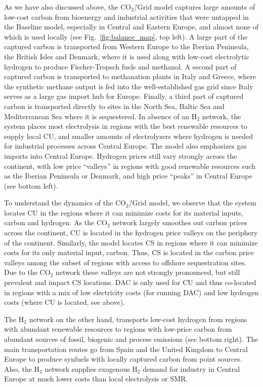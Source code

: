 \documentclass[twocolumn]{article}
\newcommand{\COtwo}{CO$_2$}
\newcommand{\Htwo}{H$_2$}
\newcommand{\modBase}{Baseline model}
\newcommand{\modCO}{CO$_2$\=/Grid model}
\begin{document}
As we have also discussed above, the \modCO{} captures large amounts of low-cost carbon from bioenergy and industrial activities that were untapped in the \modBase{}, especially in Central and Eastern Europe, and almost none of which is used locally (see Fig.~\ref{fig:balance_map}, top left). A large part of the captured carbon is transported from Western Europe to the Iberian Peninsula, the British Isles and Denmark, where it is used along with low-cost electrolytic hydrogen to produce Fischer-Tropsch fuels and methanol. A second part of captured carbon is transported to methanation plants in Italy and Greece, where the synthetic methane output is fed into the well-established gas grid since Italy serves as a large gas import hub for Europe. Finally, a third part of captured carbon is transported directly to sites in the North Sea, Baltic Sea and Mediterranean Sea where it is sequestered. In absence of an \Htwo{} network, the system places most electrolysis in regions with the best renewable resources to supply local CU, and smaller amounts of electrolyzers where hydrogen is needed for industrial processes across Central Europe. The model also emphasizes gas imports into Central Europe. Hydrogen prices still vary strongly across the continent, with low price ``valleys'' in regions with good renewable resources such as the Iberian Peninsula or Denmark, and high price ``peaks'' in Central Europe (see bottom left).

To understand the dynamics of the \modCO{}, we observe that the system locates CU in the regions where it can minimize costs for its material inputs, carbon and hydrogen. As the \COtwo{} network largely smoothes out carbon prices across the continent, CU is located in the hydrogen price valleys on the periphery of the continent. Similarly, the model locates CS in regions where it can minimize costs for its only material input, carbon. Thus, CS is located in the carbon price valleys among the subset of regions with access to offshore sequestration sites. Due to the \COtwo{} network these valleys are not strongly pronounced, but still prevalent and impact CS locations. DAC is only used for CU and thus co-located in regions with a mix of low electricity costs (for running DAC) and low hydrogen costs (where CU is located, see above).

The \Htwo{} network on the other hand, transports low-cost hydrogen from regions with abundant renewable resources to regions with low-price carbon from abundant sources of fossil, biogenic and process emissions (see bottom right). The main transportation routes go from Spain and the United Kingdom to Central Europe to produce synfuels with locally captured carbon from point sources. Also, the \Htwo{} network supplies exogenous \Htwo{} demand for industry in Central Europe at much lower costs than local electrolysis or SMR.
\end{document}
